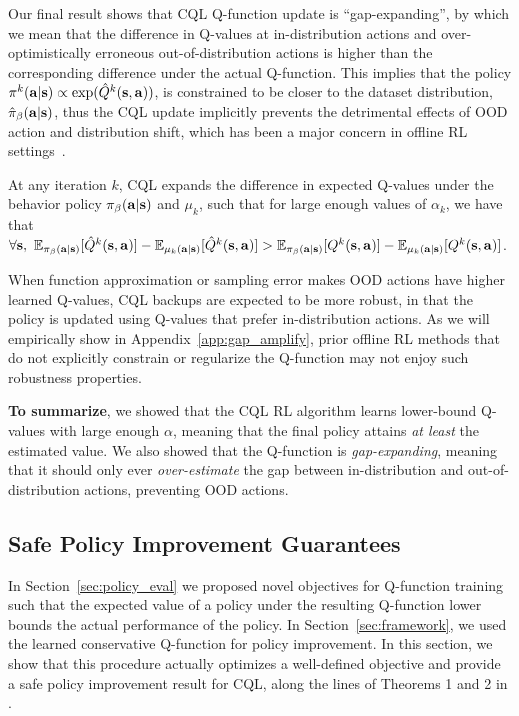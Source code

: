 Our final result shows that CQL Q-function update is ``gap-expanding'', by which we mean that the difference in Q-values at in-distribution actions and over-optimistically erroneous out-of-distribution actions is higher than the corresponding difference under the actual Q-function. This implies that the policy $\pi^k(\mathbf{a}|\mathbf{s}) \propto \exp(\hat{Q}^k(\mathbf{s}, \mathbf{a}))$, is constrained to be closer to the dataset distribution, $\hat{\pi}_\beta(\mathbf{a}|\mathbf{s})$, thus the CQL update implicitly prevents the detrimental effects of OOD action and distribution shift, which has been a major concern in offline RL settings~\citep{kumar2019stabilizing,levine2020offline,fujimoto2018off}.
\begin{theorem} 
\label{thm:gap_amplify}
At any iteration $k$, CQL expands the difference in expected Q-values under the behavior policy ${\pi_\beta}(\mathbf{a}|\mathbf{s})$ and $\mu_k$, such that for large enough values of $\alpha_k$, we have that \mbox{$\forall \mathbf{s}, ~\mathbb{E}_{{\pi_\beta}(\mathbf{a}|\mathbf{s})}[\hat{Q}^k(\mathbf{s}, \mathbf{a})] - \mathbb{E}_{\mu_k(\mathbf{a}|\mathbf{s})}[\hat{Q}^k(\mathbf{s}, \mathbf{a})] > \mathbb{E}_{{\pi_\beta}(\mathbf{a}|\mathbf{s})}[{Q}^k(\mathbf{s}, \mathbf{a})] - \mathbb{E}_{\mu_k(\mathbf{a}|\mathbf{s})}[{Q}^k(\mathbf{s}, \mathbf{a})]$}.
\end{theorem}
When function approximation or sampling error makes OOD actions have higher learned Q-values, CQL backups are expected to be more robust, in that the policy is updated using Q-values that prefer in-distribution actions. 
As we will empirically show in Appendix~\ref{app:gap_amplify}, prior offline RL methods that do not explicitly constrain or regularize the Q-function may not enjoy such robustness properties.

\textbf{To summarize}, we showed that the CQL RL algorithm learns lower-bound Q-values with large enough $\alpha$, meaning that the final policy attains \emph{at least} the estimated value. We also showed that the Q-function is \emph{gap-expanding}, meaning that it should only ever \emph{over-estimate} the gap between in-distribution and out-of-distribution actions, preventing OOD actions.

\subsection{Safe Policy Improvement Guarantees}
In Section~\ref{sec:policy_eval} we proposed novel objectives for Q-function training such that the expected value of a policy under the resulting Q-function lower bounds the actual performance of the policy. In Section~\ref{sec:framework}, we used the learned conservative Q-function for policy improvement. In this section, we show that this procedure actually optimizes a well-defined objective and provide a safe policy improvement result for CQL, along the lines of Theorems 1 and 2 in \citet{laroche2017safe}.

